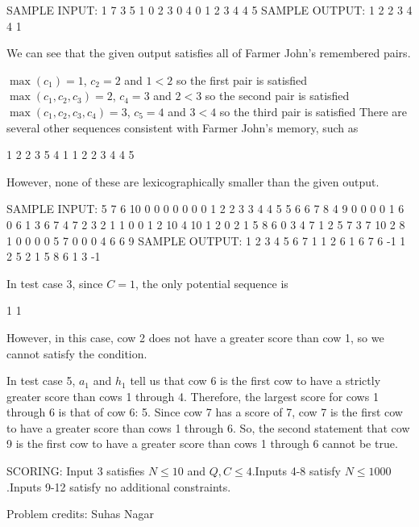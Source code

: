 \documentclass[12pt]{article}
\begin{document}
SAMPLE INPUT:
1
7 3 5
1 0 2 3 0 4 0
1 2
3 4
4 5
SAMPLE OUTPUT: 
1 2 2 3 4 4 1

We can see that the given output satisfies all of Farmer John's remembered
pairs.

$\max(c_1) = 1$, $c_2 = 2$ and $1<2$ so the first pair is satisfied$\max(c_1,c_2,c_3) = 2$, $c_4 = 3$ and $2<3$ so the second pair is
satisfied$\max(c_1,c_2,c_3,c_4) = 3$, $c_5 = 4$ and $3<4$ so the third
pair is satisfied
There are several other sequences consistent with Farmer John's memory, such as

1 2 2 3 5 4 1
1 2 2 3 4 4 5

However, none of these are lexicographically smaller than the given output.

SAMPLE INPUT:
5
7 6 10
0 0 0 0 0 0 0
1 2
2 3
3 4
4 5
5 6
6 7
8 4 9
0 0 0 0 1 6 0 6
1 3
6 7
4 7
2 3
2 1 1
0 0
1 2
10 4 10
1 2 0 2 1 5 8 6 0 3
4 7
1 2
5 7
3 7
10 2 8
1 0 0 0 0 5 7 0 0 0
4 6
6 9
SAMPLE OUTPUT: 
1 2 3 4 5 6 7
1 1 2 6 1 6 7 6
-1
1 2 5 2 1 5 8 6 1 3
-1

In test case 3, since $C=1$, the only potential sequence is

1 1

However, in this case, cow 2 does not have a greater score than cow 1, so we
cannot satisfy the condition.

In test case 5, $a_1$ and $h_1$ tell us that cow 6 is the first cow to have a
strictly greater score than cows 1 through 4. Therefore, the largest score for
cows 1 through 6 is that of cow 6:  5. Since cow 7 has a score of 7, cow 7 is
the first cow to have a greater score than cows 1 through 6. So, the second
statement that cow 9 is the first cow to have a greater score than cows 1
through 6 cannot be true.

SCORING:
Input 3 satisfies $N \leq 10$ and $Q, C \leq 4$.Inputs 4-8 satisfy
$N \leq 1000$.Inputs 9-12 satisfy no additional constraints.


Problem credits: Suhas Nagar
\end{document}
